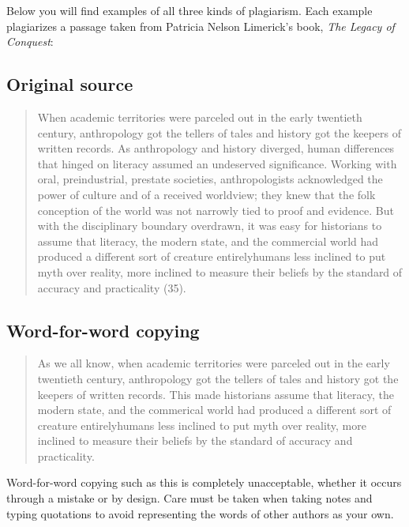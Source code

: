 Below you will find examples of all three kinds of plagiarism. Each example plagiarizes a passage
taken from Patricia Nelson Limerick's book, \emph{The Legacy of Conquest}:

\subsection{Original source}

\begin{quote}
When academic territories were parceled out in the early twentieth century, anthropology got the tellers of tales and history got the keepers of written records.  As anthropology and history diverged, human differences that hinged on literacy assumed an undeserved significance.  Working with oral, preindustrial, prestate societies, anthropologists acknowledged the power of culture and of a received worldview; they knew that the folk conception of the world was not narrowly tied to proof and evidence.  But with the disciplinary boundary overdrawn, it was easy for historians to assume that literacy, the modern state, and the commercial world had produced a different sort of creature entirely\textemdash humans less inclined to put myth over reality, more inclined to measure their beliefs by the standard of accuracy and practicality (35).
\end{quote}

\subsection{Word-for-word copying}

\begin{Spacing}{1.5}
\begin{quote}
As we all know, when academic territories were parceled out in the early twentieth century, anthropology got the tellers of tales and history got the keepers of written records. This made historians assume that literacy, the modern state, and the commerical world had produced a different sort of creature entirely\textemdash humans less inclined to put myth over reality, more inclined to measure their beliefs by the standard of accuracy and practicality. 
\end{quote} 

\end{Spacing}

 Word-for-word copying such as this is completely unacceptable, whether it occurs through a mistake or by design. Care must be taken when taking notes and typing quotations to avoid representing the words of other authors as your own. 

